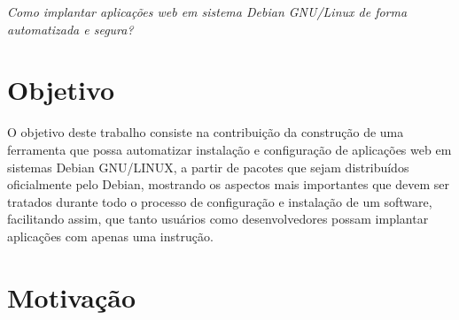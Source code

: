 \begin{center}
  \textit{
  Como implantar aplicações web em sistema Debian GNU/Linux de forma automatizada
  e segura?
}
\end{center}

\section{Objetivo}

O objetivo deste trabalho consiste na contribuição da construção de uma ferramenta
que possa automatizar instalação e configuração de aplicações web em sistemas
Debian GNU/LINUX, a partir de pacotes que sejam distribuídos oficialmente pelo
Debian, mostrando os aspectos mais importantes que devem ser tratados durante
todo o processo de configuração e instalação de um software, facilitando assim, que
tanto usuários como desenvolvedores possam implantar aplicações com apenas uma
instrução.

%


\section{Motivação}

